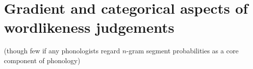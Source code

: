 \chapter{Gradient and categorical aspects of wordlikeness judgements}
\label{gradience}

(though few if any phonologists regard $n$-gram segment probabilities as a core component of phonology)






